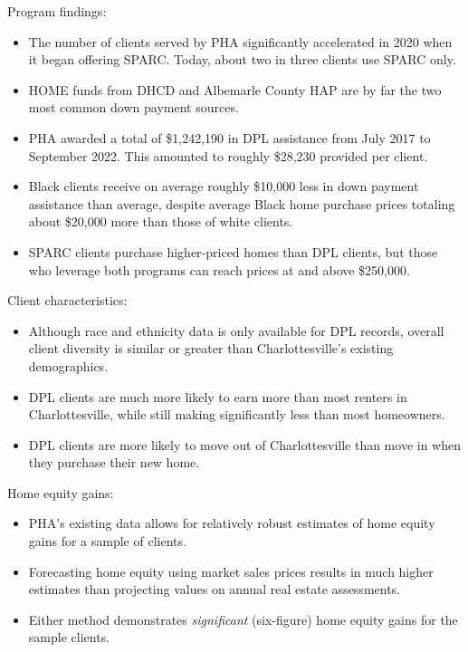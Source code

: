 \documentclass[
  letterpaper,
  DIV=11,
  numbers=noendperiod]{scrartcl}
\providecommand{\tightlist}{%
  \setlength{\itemsep}{0pt}\setlength{\parskip}{0pt}}\usepackage{longtable,booktabs,array}
\begin{document}
Program findings:

\begin{itemize}
\tightlist
\item
  The number of clients served by PHA significantly accelerated in 2020
  when it began offering SPARC. Today, about two in three clients use
  SPARC only.
\item
  HOME funds from DHCD and Albemarle County HAP are by far the two most
  common down payment sources.
\item
  PHA awarded a total of \$1,242,190 in DPL assistance from July 2017 to
  September 2022. This amounted to roughly \$28,230 provided per client.
\item
  Black clients receive on average roughly \$10,000 less in down payment
  assistance than average, despite average Black home purchase prices
  totaling about \$20,000 more than those of white clients.
\item
  SPARC clients purchase higher-priced homes than DPL clients, but those
  who leverage both programs can reach prices at and above \$250,000.
\end{itemize}

Client characteristics:

\begin{itemize}
\tightlist
\item
  Although race and ethnicity data is only available for DPL records,
  overall client diversity is similar or greater than Charlottesville's
  existing demographics.
\item
  DPL clients are much more likely to earn more than most renters in
  Charlottesville, while still making significantly less than most
  homeowners.
\item
  DPL clients are more likely to move out of Charlottesville than move
  in when they purchase their new home.
\end{itemize}

Home equity gains:

\begin{itemize}
\tightlist
\item
  PHA's existing data allows for relatively robust estimates of home
  equity gains for a sample of clients.
\item
  Forecasting home equity using market sales prices results in much
  higher estimates than projecting values on annual real estate
  assessments.
\item
  Either method demonstrates \emph{significant} (six-figure) home equity
  gains for the sample clients.
\end{itemize}
\end{document}
